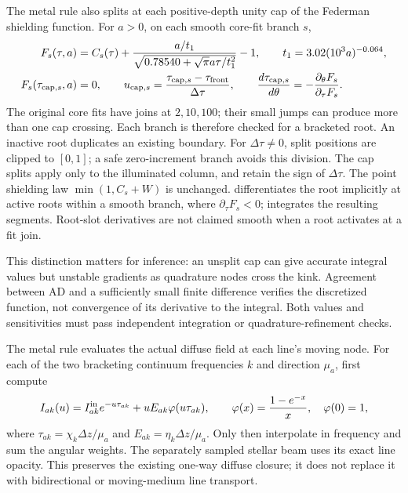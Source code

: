 \documentclass[10pt,a4paper]{article}
\begin{document}
The metal rule also splits at each positive-depth unity cap of the
Federman shielding function. For $a>0$, on each smooth core-fit branch $s$,
\begin{align}
 F_s(\tau,a)&=C_s(\tau)
   +\frac{a/t_1}{\sqrt{0.78540+\sqrt\pi a\tau/t_1^2}}-1,
 \qquad t_1=3.02(10^3a)^{-0.064},\\
 F_s(\tau_{{\rm cap},s},a)&=0,\qquad
 u_{{\rm cap},s}=\frac{\tau_{{\rm cap},s}-\tau_{\rm front}}{\Delta\tau},
 \qquad
 \frac{d\tau_{{\rm cap},s}}{d\theta}
 =-\frac{\partial_\theta F_s}{\partial_\tau F_s}.
 \label{eq:metal_shielding_cap}
\end{align}
The original core fits have joins at $2,10,100$; their small jumps can
produce more than one cap crossing. Each branch is therefore checked for a
bracketed root. An inactive root duplicates an existing boundary. For
$\Delta\tau\ne0$, split positions are clipped to $[0,1]$; a safe zero-increment
branch avoids this division. The cap
splits apply only to the illuminated column, and retain the sign of
$\Delta\tau$. The point shielding law $\min(1,C_s+W)$ is unchanged.
 differentiates the root
implicitly at active roots within a smooth branch, where $\partial_\tau F_s<0$;
 integrates the
resulting segments. Root-slot derivatives are not claimed smooth when a
root activates at a fit join.

This distinction matters for inference: an unsplit cap can give accurate
integral values but unstable gradients as quadrature nodes cross the kink.
Agreement between AD and a sufficiently small finite difference verifies
the discretized function, not convergence of its derivative to the integral.
Both values and sensitivities must pass independent integration or
quadrature-refinement checks.

The metal rule evaluates the actual diffuse field at each line's moving
node. For each of the two bracketing continuum frequencies $k$ and direction
$\mu_a$, first compute
\begin{equation}
 I_{ak}(u)=I_{ak}^{\rm in}e^{-u\tau_{ak}}
       +uE_{ak}\varphi(u\tau_{ak}),\qquad
 \varphi(x)=\frac{1-e^{-x}}x,\quad \varphi(0)=1,
 \label{eq:line_node_continuum}
\end{equation}
where $\tau_{ak}=\chi_k\Delta z/\mu_a$ and
$E_{ak}=\eta_k\Delta z/\mu_a$. Only then interpolate in frequency and
sum the angular weights. The separately sampled stellar beam uses its
exact line opacity. This preserves the existing one-way diffuse closure;
it does not replace it with bidirectional or moving-medium line transport.
\end{document}
